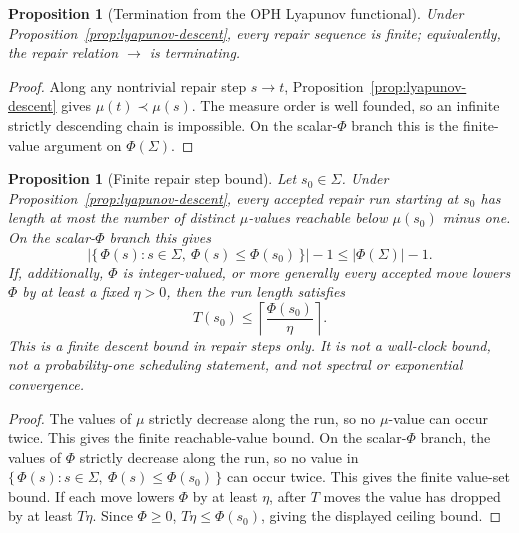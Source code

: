 \documentclass[11pt]{article}
\newtheorem{proposition}[theorem]{Proposition}
\theoremstyle{remark}
\theoremstyle{plain}
\begin{document}
\begin{proposition}[Termination from the OPH Lyapunov functional]\label{prop:lyapunov-termination}
Under Proposition~\ref{prop:lyapunov-descent}, every repair sequence is finite; equivalently, the
repair relation \(\to\) is terminating.
\end{proposition}

\begin{proof}
Along any nontrivial repair step \(s\to t\), Proposition~\ref{prop:lyapunov-descent} gives
\(\mu(t)\prec\mu(s)\). The measure order is well founded, so an infinite strictly descending chain
is impossible. On the scalar-\(\Phi\) branch this is the finite-value argument on
\(\Phi(\Sigma)\).
\end{proof}

\begin{proposition}[Finite repair step bound]\label{prop:finite-step-bound}
Let \(s_0\in\Sigma\). Under Proposition~\ref{prop:lyapunov-descent}, every accepted repair run
starting at \(s_0\) has length at most the number of distinct \(\mu\)-values reachable below
\(\mu(s_0)\) minus one. On the scalar-\(\Phi\) branch this gives
\[
\bigl|\{\,\Phi(s):s\in\Sigma,\ \Phi(s)\le \Phi(s_0)\,\}\bigr|-1
\le |\Phi(\Sigma)|-1.
\]
If, additionally, \(\Phi\) is integer-valued, or more generally every accepted move lowers
\(\Phi\) by at least a fixed \(\eta>0\), then the run length satisfies
\[
T(s_0)\le \left\lceil\frac{\Phi(s_0)}{\eta}\right\rceil .
\]
This is a finite descent bound in repair steps only. It is not a wall-clock bound, not a
probability-one scheduling statement, and not spectral or exponential convergence.
\end{proposition}

\begin{proof}
The values of \(\mu\) strictly decrease along the run, so no \(\mu\)-value can occur twice. This
gives the finite reachable-value bound. On the scalar-\(\Phi\) branch, the values of \(\Phi\)
strictly decrease along the run, so no value in
\(\{\,\Phi(s):s\in\Sigma,\ \Phi(s)\le \Phi(s_0)\,\}\) can occur twice. This gives the finite
value-set bound. If each move lowers \(\Phi\) by at least \(\eta\), after \(T\) moves the value has
dropped by at least \(T\eta\). Since \(\Phi\ge0\), \(T\eta\le\Phi(s_0)\), giving the displayed
ceiling bound.
\end{proof}
\end{document}
